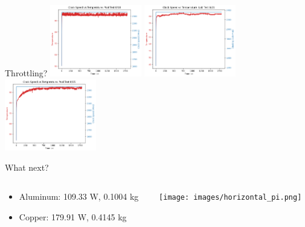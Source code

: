 \begin{frame}{Throttling?}
    \includegraphics[width=0.3\textwidth,keepaspectratio]{images/clock_speed_8-18.png}
    \includegraphics[width=0.3\textwidth,keepaspectratio]{images/clock_speed_8-21.png}
    \includegraphics[width=0.3\textwidth,keepaspectratio]{images/clock_speed_8-25.png}
\end{frame}

\begin{frame}{What next?}
    \begin{columns}
        \begin{column}{0.5\textwidth}
            \begin{itemize}
                \item Aluminum: 109.33 W, 0.1004 kg
                \item Copper: 179.91 W, 0.4145 kg
            \end{itemize}
        \end{column}
        \begin{column}{0.5\textwidth}
            \texttt{[image: images/horizontal\_pi.png]}
        \end{column}
    \end{columns}
\end{frame}